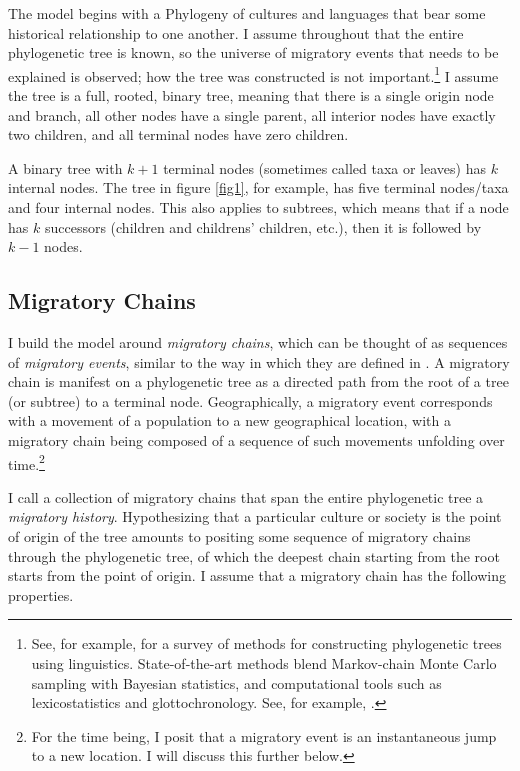 \documentclass[11pt]{article}
\begin{document}
The model begins with a Phylogeny of cultures and languages that bear some historical relationship to one another. I assume throughout that the entire phylogenetic tree is known, so the universe of migratory events that needs to be explained is observed; how the  tree was constructed is not important.\footnote{See, for example, \citet{nichols97} for a survey of methods for constructing phylogenetic trees using linguistics. State-of-the-art methods blend Markov-chain Monte Carlo sampling with Bayesian statistics, and computational tools such as lexicostatistics and glottochronology. See, for example, \cite{atkinson03}.}  I assume the tree is a full, rooted, binary tree, meaning that there is a single origin node and branch, all other nodes have a single parent, all interior nodes have exactly two children, and all terminal nodes have zero children. 

A binary tree with $k+1$ terminal nodes (sometimes called taxa or leaves) has $k$ internal nodes. The tree in figure \ref{fig1}, for example,  has five terminal nodes/taxa  and four internal nodes. This also applies to subtrees, which means that if a node has $k$ successors (children and childrens' children, etc.), then it is followed by $k-1$ nodes.

\subsection{Migratory Chains}
 
I build the model around \textit{migratory chains}, which can be thought of as sequences of \textit{migratory events}, similar to the way in which they are defined in \cite{dyen56}. A migratory chain is manifest on a phylogenetic tree as a directed path from the root of a tree (or subtree) to a terminal node. Geographically, a migratory event corresponds with a movement of a population to a new geographical location, with a migratory chain being composed of a sequence of such movements unfolding over time.\footnote{For the time being, I posit that a migratory event is an instantaneous jump to a new location. I will discuss this further below.}

 I call a  collection of migratory chains that span the entire phylogenetic tree a \textit{migratory history}. Hypothesizing that a particular culture or society is the point of origin of the tree amounts to positing some sequence of migratory chains through the phylogenetic tree, of which the deepest chain starting from the root starts from the point of origin. I assume that a migratory chain has the following properties.
\end{document}

